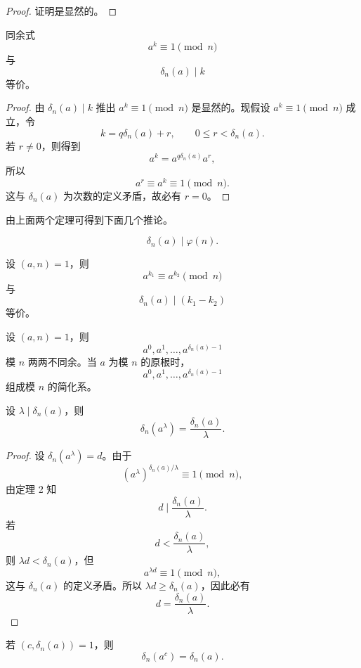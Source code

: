 \begin{proof}
	证明是显然的。
\end{proof}

\begin{theorem}[原文 定理 2]
	同余式
	\[
		a^k\equiv 1\pmod n
	\]
	与
	\[
		\delta_n(a)\mid k
	\]
	等价。
\end{theorem}

\begin{proof}
	由 $\delta_n(a)\mid k$ 推出 $a^k\equiv 1\pmod n$ 是显然的。现假设 $a^k\equiv 1\pmod n$ 成立，令
	\[
		k=q\delta_n(a)+r,\qquad 0\leq r<\delta_n(a).
	\]
	若 $r\neq 0$，则得到
	\[
		a^k=a^{q\delta_n(a)}a^r,
	\]
	所以
	\[
		a^r\equiv a^k\equiv 1\pmod n.
	\]
	这与 $\delta_n(a)$ 为次数的定义矛盾，故必有 $r=0$。
\end{proof}

由上面两个定理可得到下面几个推论。

\begin{corollary}[原文 推论 1]
	\[
		\delta_n(a)\mid \varphi(n).
	\]
\end{corollary}

\begin{corollary}[原文 推论 2]
	设 $(a,n)=1$，则
	\[
		a^{k_1}\equiv a^{k_2}\pmod n
	\]
	与
	\[
		\delta_n(a)\mid (k_1-k_2)
	\]
	等价。
\end{corollary}

\begin{corollary}[原文 推论 3]
	设 $(a,n)=1$，则
	\[
		a^0,a^1,\ldots,a^{\delta_n(a)-1}
	\]
	模 $n$ 两两不同余。当 $a$ 为模 $n$ 的原根时，
	\[
		a^0,a^1,\ldots,a^{\delta_n(a)-1}
	\]
	组成模 $n$ 的简化系。
\end{corollary}

\begin{theorem}[原文 定理 3]
	设 $\lambda\mid \delta_n(a)$，则
	\[
		\delta_n(a^\lambda)=\frac{\delta_n(a)}{\lambda}.
	\]
\end{theorem}

\begin{proof}
	设 $\delta_n(a^\lambda)=d$。由于
	\[
		(a^\lambda)^{\delta_n(a)/\lambda}\equiv 1\pmod n,
	\]
	由定理 2 知
	\[
		d\mid \frac{\delta_n(a)}{\lambda}.
	\]
	若
	\[
		d<\frac{\delta_n(a)}{\lambda},
	\]
	则 $\lambda d<\delta_n(a)$，但
	\[
		a^{\lambda d}\equiv 1\pmod n,
	\]
	这与 $\delta_n(a)$ 的定义矛盾。所以 $\lambda d\geq \delta_n(a)$，因此必有
	\[
		d=\frac{\delta_n(a)}{\lambda}.
	\]
\end{proof}

\begin{theorem}[原文 定理 4]
	若 $(c,\delta_n(a))=1$，则
	\[
		\delta_n(a^c)=\delta_n(a).
	\]
\end{theorem}

